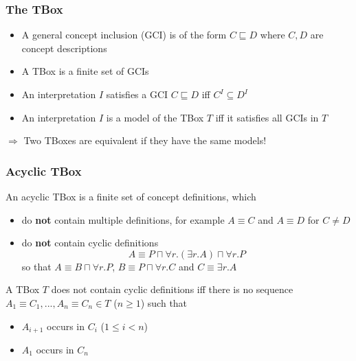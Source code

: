 \documentclass[conference, a4paper]{styles/acmsiggraph}
\begin{document}
        \subsubsection{The TBox}
            \begin{itemize}
                \item A general concept inclusion (GCI) is of the form $C \sqsubseteq D$ where $C,D$ are concept descriptions
                \item A TBox is a finite set of GCIs
                \item An interpretation $I$ satisfies a GCI $C \sqsubseteq D$ iff $C^I \subseteq D^I$
                \item An interpretation $I$ is a model of the TBox $T$ iff it satisfies all GCIs in $T$
            \end{itemize}
            $\Rightarrow$ Two TBoxes are equivalent if they have the same models!
        
        \subsubsection{Acyclic TBox}
            An acyclic TBox is a finite set of concept definitions, which
            \begin{itemize}
                \item do \textbf{not} contain multiple definitions, for example $A \equiv C$ and $A \equiv D$ for $C \neq D$
                \item do \textbf{not} contain cyclic definitions
                    $$A \equiv P \sqcap \forall r.(\exists r.A) \sqcap \forall r.P$$
                    so that $A \equiv B \sqcap \forall r.P$, $B \equiv P \sqcap \forall r.C$ and $C \equiv \exists r.A$
            \end{itemize}
            A TBox $T$ does not contain cyclic definitions iff there is no sequence $A_1 \equiv C_1,...,A_n \equiv C_n \in T$ ($n \geq 1$) such that 
                \begin{itemize}
                    \item $A_{i+1}$ occurs in $C_i$ ($1 \leq i < n$)
                    \item $A_1$ occurs in $C_n$
                \end{itemize}
    
\newpage
    
\end{document}
